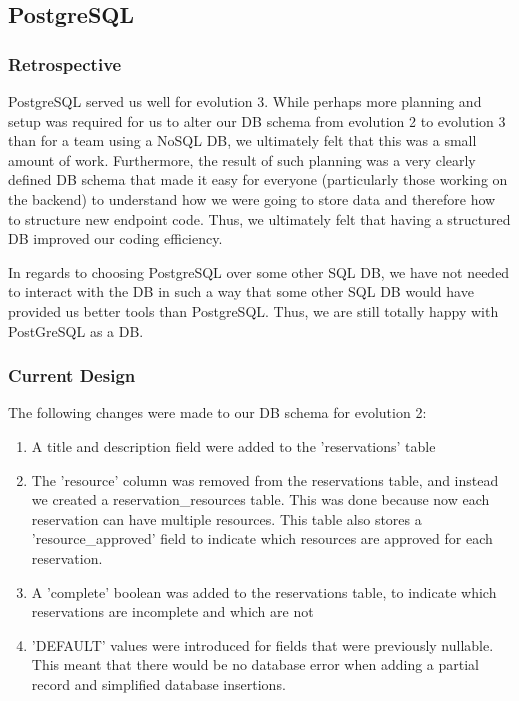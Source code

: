 \documentclass[12pt]{article}
\begin{document}
\subsection{PostgreSQL}
\subsubsection{Retrospective}
PostgreSQL served us well for evolution 3. While perhaps more planning and setup was required for us to alter our DB schema from evolution 2 to evolution 3 than for a team using a NoSQL DB, we ultimately felt that this was a small amount of work. Furthermore, the result of such planning was a very clearly defined DB schema that made it easy for everyone (particularly those working on the backend) to understand how we were going to store data and therefore how to structure new endpoint code. Thus, we ultimately felt that having a structured DB improved our coding efficiency. 

In regards to choosing PostgreSQL over some other SQL DB, we have not needed to interact with the DB in such a way that some other SQL DB would have provided us better tools than PostgreSQL. Thus, we are still totally happy with PostGreSQL as a DB. 

\subsubsection{Current Design}
The following changes were made to our DB schema for evolution 2:

\begin{enumerate}
    \item A title and description field were added to the 'reservations' table
    \item The 'resource' column was removed from the reservations table, and instead we created a reservation\_resources table. This was done because now each reservation can have multiple resources. This table also stores a 'resource\_approved' field to indicate which resources are approved for each reservation. 
    \item A 'complete' boolean was added to the reservations table, to indicate which reservations are incomplete and which are not
    \item 'DEFAULT' values were introduced for fields that were previously nullable. This meant that there would be no database error when adding a partial record and simplified database insertions. 
\end{enumerate}
\end{document}
